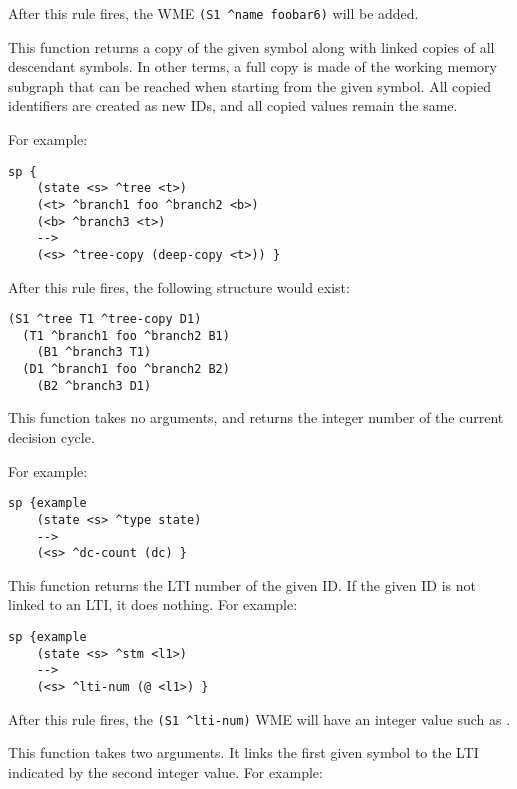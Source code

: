 \begin{description}
       After this rule fires, the WME \verb=(S1 ^name foobar6)= will be added.


\item [\soarb{deep-copy} --- ] This function returns a copy of the given symbol
along with linked copies of all descendant symbols. In other terms, a full copy is made of
the working memory subgraph that can be reached when starting from the given symbol.
All copied identifiers are created as new IDs, and all copied values remain the same.

For example:

\begin{verbatim}
sp {
    (state <s> ^tree <t>)
    (<t> ^branch1 foo ^branch2 <b>)
    (<b> ^branch3 <t>)
    -->
    (<s> ^tree-copy (deep-copy <t>)) }
\end{verbatim}

After this rule fires, the following structure would exist:

\begin{verbatim}
(S1 ^tree T1 ^tree-copy D1)
  (T1 ^branch1 foo ^branch2 B1)
    (B1 ^branch3 T1)
  (D1 ^branch1 foo ^branch2 B2)
    (B2 ^branch3 D1)
\end{verbatim}


\item [\soarb{dc} --- ] This function takes no arguments, and returns
the integer number of the current decision cycle. 

For example:

\begin{verbatim}
sp {example
    (state <s> ^type state)
    -->
    (<s> ^dc-count (dc) }
\end{verbatim}


\item [\soarb{@ (get)} --- ] This function returns the LTI number of the
given ID. If the given ID is not linked to an LTI, it does nothing.
For example:

\begin{verbatim}
sp {example
    (state <s> ^stm <l1>)
    -->
    (<s> ^lti-num (@ <l1>) }
\end{verbatim}

After this rule fires, the \verb|(S1 ^lti-num)| WME will have an integer value such as .


\item [\soarb{link-stm-to-ltm} --- ] This function takes two arguments. 
It links the first given symbol to the LTI indicated by the second integer value.
For example:


\end{description}
